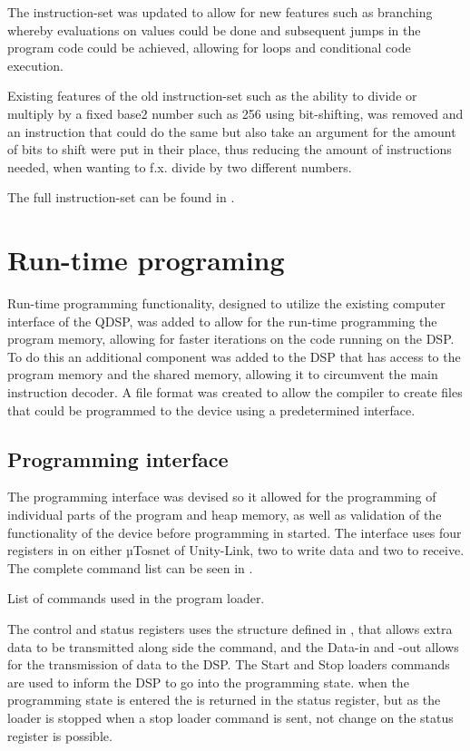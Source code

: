 The instruction-set was updated to allow for new features such as branching whereby evaluations on values could be done and subsequent jumps in the program code could be achieved, allowing for loops and conditional code execution.

Existing features of the old instruction-set such as the ability to divide or multiply by a fixed base2 number such as 256 using bit-shifting, was removed and an instruction that could do the same but also take an argument for the amount of bits to shift were put in their place, thus reducing the amount of instructions needed, when wanting to f.x. divide by two different numbers.

The full instruction-set can be found in .

\section{Run-time programing}
Run-time programming functionality, designed to utilize the existing computer interface of the QDSP, was added to allow for the run-time programming the program memory, allowing for faster iterations on the code running on the DSP. To do this an additional component was added to the DSP that has access to the program memory and the shared memory, allowing it to circumvent the main instruction decoder. A file format was created to allow the compiler to create files that could be programmed to the device using a predetermined interface.
\subsection{Programming interface}
The programming interface was devised so it allowed for the programming of individual parts of the program and heap memory, as well as validation of the functionality of the device before programming in started. The interface uses four registers in on either µTosnet of Unity-Link, two to write data and two to receive. The complete command list can be seen in .

\begin{table}[H]
	\centering
		
		\caption{List of commands used in the program loader.}
		\label{tab:registers}
\end{table}


The control and status registers uses the structure defined in , that allows extra data to be transmitted along side the command, and the Data-in and -out allows for the transmission of data to the DSP. The Start and Stop loaders commands are used to inform the DSP to go into the programming state. when the programming state is entered the is returned in the status register, but as the loader is stopped when a stop loader command is sent, not change on the status register is possible.

